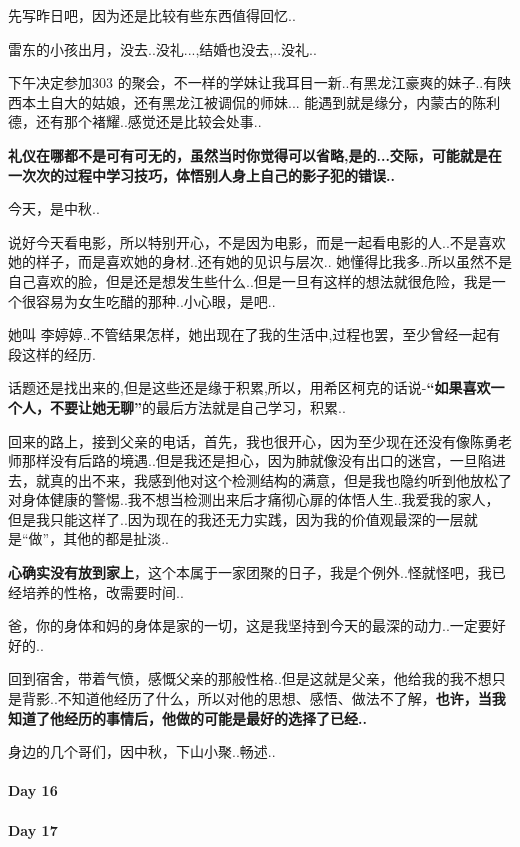 \documentclass[UTF8,a4paper,8pt]{ctexbook}
\begin{document}
	 	 先写昨日吧，因为还是比较有些东西值得回忆..
	 	 
	 	 雷东的小孩出月，没去..没礼...,结婚也没去,..没礼..
	 	 
	 	 下午决定参加303 的聚会，不一样的学妹让我耳目一新..有黑龙江豪爽的妹子..有陕西本土自大的姑娘，还有黑龙江被调侃的师妹... 能遇到就是缘分，内蒙古的陈利德，还有那个褚耀..感觉还是比较会处事..
	 	 
	 	 \textbf{礼仪在哪都不是可有可无的，虽然当时你觉得可以省略,是的...交际，可能就是在一次次的过程中学习技巧，体悟别人身上自己的影子犯的错误..}
	 	 
	 	 今天，是中秋..
	 	 
	 	 说好今天看电影，所以特别开心，不是因为电影，而是一起看电影的人..不是喜欢她的样子，而是喜欢她的身材..还有她的见识与层次.. 她懂得比我多..所以虽然不是自己喜欢的脸，但是还是想发生些什么..但是一旦有这样的想法就很危险，我是一个很容易为女生吃醋的那种..小心眼，是吧..
	 	 
	 	 她叫 李婷婷..不管结果怎样，她出现在了我的生活中,过程也罢，至少曾经一起有段这样的经历.
	 	 
	 	 话题还是找出来的,但是这些还是缘于积累,所以，用希区柯克的话说-\textbf{“如果喜欢一个人，不要让她无聊”}的最后方法就是自己学习，积累..
	 	 
	 	 回来的路上，接到父亲的电话，首先，我也很开心，因为至少现在还没有像陈勇老师那样没有后路的境遇..但是我还是担心，因为肺就像没有出口的迷宫，一旦陷进去，就真的出不来，我感到他对这个检测结构的满意，但是我也隐约听到他放松了对身体健康的警惕..我不想当检测出来后才痛彻心扉的体悟人生..我爱我的家人，但是我只能这样了..因为现在的我还无力实践，因为我的价值观最深的一层就是“做”，其他的都是扯淡..
	 	 
	 	 \textbf{心确实没有放到家上}，这个本属于一家团聚的日子，我是个例外..怪就怪吧，我已经培养的性格，改需要时间..
	 	 
	 	 爸，你的身体和妈的身体是家的一切，这是我坚持到今天的最深的动力..一定要好好的..
	 	 
	 	 回到宿舍，带着气愤，感慨父亲的那般性格..但是这就是父亲，他给我的我不想只是背影..不知道他经历了什么，所以对他的思想、感悟、做法不了解，\textbf{也许，当我知道了他经历的事情后，他做的可能是最好的选择了已经..}
	 	 
	 	 身边的几个哥们，因中秋，下山小聚..畅述..
 	 \paragraph{Day 16      \quad     }
 	 \paragraph{Day 17      \quad     }
\end{document}
